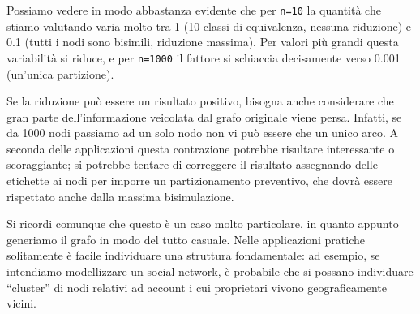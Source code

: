 Possiamo vedere in modo abbastanza evidente che per \verb|n=10| la quantità che stiamo valutando varia molto tra 1 (10 classi di equivalenza, nessuna riduzione) e 0.1 (tutti i nodi sono bisimili, riduzione massima). Per valori più grandi questa variabilità si riduce, e per \verb|n=1000| il fattore si schiaccia decisamente verso 0.001 (un'unica partizione).

Se la riduzione può essere un risultato positivo, bisogna anche considerare che gran parte dell'informazione veicolata dal grafo originale viene persa. Infatti, se da 1000 nodi passiamo ad un solo nodo non vi può essere che un unico arco. A seconda delle applicazioni questa contrazione potrebbe risultare interessante o scoraggiante; si potrebbe tentare di correggere il risultato assegnando delle etichette ai nodi per imporre un partizionamento preventivo, che dovrà essere rispettato anche dalla massima bisimulazione.

Si ricordi comunque che questo è un caso molto particolare, in quanto appunto generiamo il grafo in modo del tutto casuale. Nelle applicazioni pratiche solitamente è facile individuare una struttura fondamentale: ad esempio, se intendiamo modellizzare un social network, è probabile che si possano individuare ``cluster'' di nodi relativi ad account i cui proprietari vivono geograficamente vicini.
